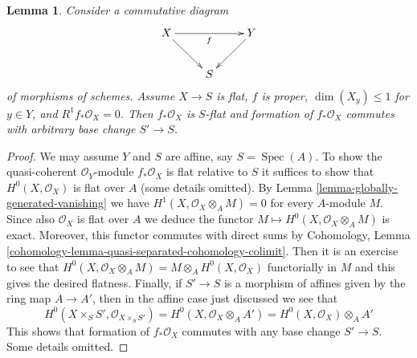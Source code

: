\documentclass[10pt,a4paper]{amsart}
\theoremstyle{plain}
\newtheorem{lemma}[subsection]{Lemma}
\theoremstyle{definition}
\theoremstyle{remark}
\numberwithin{equation}{subsection}
\def\Spec{\mathop{\mathrm{Spec}}}
\begin{document}
\begin{lemma}
\label{lemma-h1-fibre-zero-h0-flat}
Consider a commutative diagram
$$
\xymatrix{
X \ar[rr]_f \ar[rd] & & Y \ar[ld] \\
& S
}
$$
of morphisms of schemes. Assume $X \to S$
is flat, $f$ is proper, $\dim(X_y) \leq 1$ for $y \in Y$, and
$R^1f_*\mathcal{O}_X = 0$. Then $f_*\mathcal{O}_X$
is $S$-flat and formation of $f_*\mathcal{O}_X$ commutes
with arbitrary base change $S' \to S$.
\end{lemma}

\begin{proof}
We may assume $Y$ and $S$ are affine, say $S = \Spec(A)$.
To show the quasi-coherent $\mathcal{O}_Y$-module
$f_*\mathcal{O}_X$ is flat relative to $S$ it suffices
to show that $H^0(X, \mathcal{O}_X)$ is flat over $A$
(some details omitted).
By Lemma \ref{lemma-globally-generated-vanishing} we have
$H^1(X, \mathcal{O}_X \otimes_A M) = 0$ for every $A$-module $M$.
Since also $\mathcal{O}_X$ is flat over $A$ we deduce the functor
$M \mapsto H^0(X, \mathcal{O}_X \otimes_A M)$ is exact.
Moreover, this functor commutes with direct sums by
Cohomology, Lemma \ref{cohomology-lemma-quasi-separated-cohomology-colimit}.
Then it is an exercise to see that
$H^0(X, \mathcal{O}_X \otimes_A M) = M \otimes_A H^0(X, \mathcal{O}_X)$
functorially in $M$ and this gives the desired flatness.
Finally, if $S' \to S$ is a morphism of affines given by
the ring map $A \to A'$, then in the affine case just discussed
we see that
$$
H^0(X \times_S S', \mathcal{O}_{X \times_S S'}) =
H^0(X, \mathcal{O}_X \otimes_A A') = H^0(X, \mathcal{O}_X) \otimes_A A'
$$
This shows that formation of $f_*\mathcal{O}_X$ commutes
with any base change $S' \to S$. Some details omitted.
\end{proof}
\end{document}

